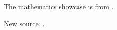 \documentclass{article}
\begin{document}
The mathematics showcase is from \autocite{Graham1995}.

New source: \autocite{TestBook2026}.

\autocite{MissingSource}

\printbibliography
\end{document}
